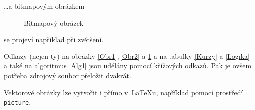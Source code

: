 \documentclass[hidelinks, 11pt, a4paper]{article}[24.03.2023]
\begin{document}
    \dots a bitmapovým obrázkem

    \begin{figure}[!ht]
        \hfill{}\hspace*{\fill}
        \caption{Bitmapový obrázek}\label{Obr3}
    \end{figure}

    se projeví například při zvětšení.

    Odkazy (nejen ty) na obrázky \ref{Obr1},\,\ref{Obr2} a \ref{Obr3} a na tabulky \ref{Kurzy} a \ref{Logika} a také na algoritmus \ref{Alg1} jsou udělány pomocí křížových odkazů.
    Pak je ovšem potřeba zdrojový soubor přeložit dvakrát.

    Vektorové obrázky lze vytvořit i přímo v~\LaTeX\textnormal{u}, například pomocí prostředí\; \verb|picture|. 


    \setlength{\unitlength}{1cm}
        
\end{document}
